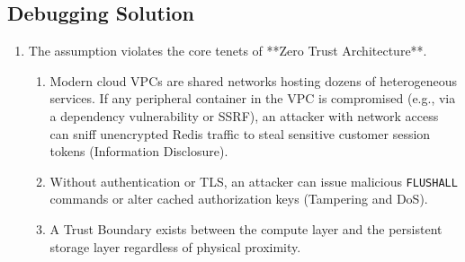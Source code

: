 \subsection*{Debugging Solution}
\begin{enumerate}[leftmargin=18pt]
  \item The assumption violates the core tenets of **Zero Trust Architecture**. 
  \begin{enumerate}
    \item Modern cloud VPCs are shared networks hosting dozens of heterogeneous services. If any peripheral container in the VPC is compromised (e.g., via a dependency vulnerability or SSRF), an attacker with network access can sniff unencrypted Redis traffic to steal sensitive customer session tokens (Information Disclosure).
    \item Without authentication or TLS, an attacker can issue malicious \texttt{FLUSHALL} commands or alter cached authorization keys (Tampering and DoS).
    \item A Trust Boundary exists between the compute layer and the persistent storage layer regardless of physical proximity.
  \end{enumerate}
\end{enumerate}

